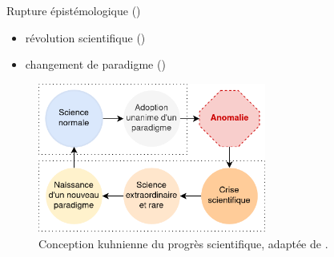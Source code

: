 \begin{frame}{\og{}Rupture\fg{} épistémologique {\small(\hypersetup{citecolor=yellow}\cite{bachelard1993formation})}}
\begin{itemize}
\item \og{}révolution scientifique\fg{} {\small(\cite{koyre1962monde})}
\item \og{}changement de paradigme\fg{} {\small(\cite{kuhn1962structure})} 
\end{itemize} 
\begin{figure}
    \centering
    \includegraphics[width=75mm,scale=0.5]{pic/doxa_episteme.png}
    \caption{Conception kuhnienne du progrès scientifique, adaptée de {\small\textcite{amiri}}.}
    \label{fig:enter-label}
\end{figure}
\end{frame}




